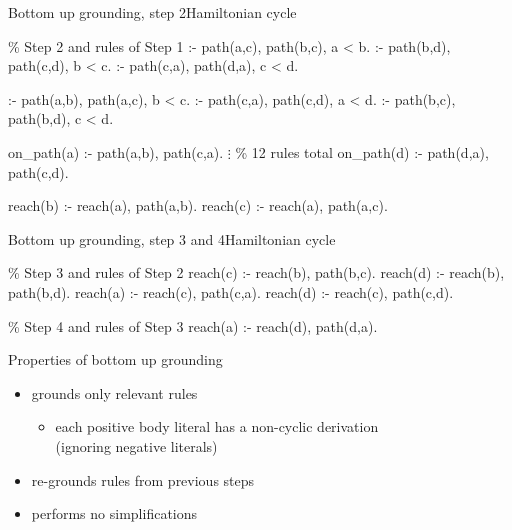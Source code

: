 \begin{frame}{Bottom up grounding, step 2}{Hamiltonian cycle}
  \vfill
\begin{SemiVerbatim}[\small]{.9}
{\color{comment}\% Step 2 \alert{and} rules of Step 1}
:- \alert{path(a,c)}, \alert{path(b,c)}, a < b.
:- \alert{path(b,d)}, \alert{path(c,d)}, b < c.
:- \alert{path(c,a)}, \alert{path(d,a)}, c < d.

:- \alert{path(a,b)}, \alert{path(a,c)}, b < c.
:- \alert{path(c,a)}, \alert{path(c,d)}, a < d.
:- \alert{path(b,c)}, \alert{path(b,d)}, c < d.

on_path(a) :- \alert{path(a,b)}, \alert{path(c,a)}.
           \(\vdots\) {\color{comment}\% 12 rules total}
on_path(d) :- \alert{path(d,a)}, \alert{path(c,d)}.

reach(b) :- \alert{reach(a)}, \alert{path(a,b)}.
reach(c) :- \alert{reach(a)}, \alert{path(a,c)}.
\end{SemiVerbatim}
\end{frame}
\begin{frame}{Bottom up grounding, step 3 and 4}{Hamiltonian cycle}
  \vfill
\begin{SemiVerbatim}{.9}
{\color{comment}\% Step 3 \alert{and} rules of Step 2}
reach(c) :- \alert{reach(b)}, path(b,c).
reach(d) :- \alert{reach(b)}, path(b,d).
reach(a) :- \alert{reach(c)}, path(c,a).
reach(d) :- \alert{reach(c)}, path(c,d).

{\color{comment}\% Step 4 \alert{and} rules of Step 3}
reach(a) :- \alert{reach(d)}, path(d,a).
\end{SemiVerbatim}
\end{frame}
\begin{frame}{Properties of bottom up grounding}
  \begin{itemize}
  \item grounds only \alert{relevant} rules
    \begin{itemize}\normalsize
    \item each positive body literal has a non-cyclic derivation \\
      (ignoring negative literals)
    \end{itemize}
    \smallskip
  \item \alert{re-grounds} rules from previous steps


  \medskip
  \item performs no \alert{simplifications}
  \end{itemize}
\end{frame}
